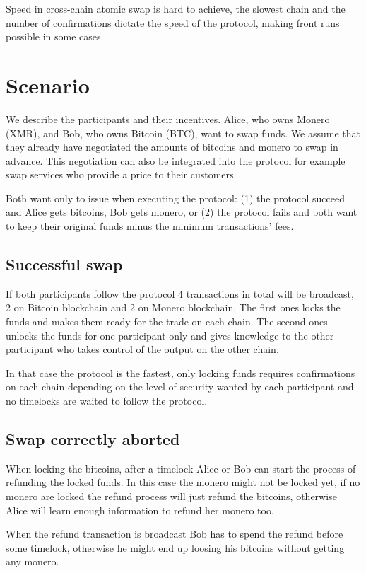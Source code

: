 \documentclass{llncs}
\begin{document}
Speed in cross-chain atomic swap is hard to achieve, the slowest chain and the number of confirmations dictate the speed of the protocol, making front runs possible in some cases.

\section{Scenario}
We describe the participants and their incentives. Alice, who owns Monero (XMR), and Bob, who owns Bitcoin (BTC), want to swap funds. We assume that they already have negotiated the amounts of bitcoins and monero to swap in advance. This negotiation can also be integrated into the protocol for example swap services who provide a price to their customers.

Both want only to issue when executing the protocol: (1) the protocol succeed and Alice gets bitcoins, Bob gets monero, or (2) the protocol fails and both want to keep their original funds minus the minimum transactions' fees.

\subsection{Successful swap}
If both participants follow the protocol 4 transactions in total will be broadcast, 2 on Bitcoin blockchain and 2 on Monero blockchain. The first ones locks the funds and makes them ready for the trade on each chain. The second ones unlocks the funds for one participant only and gives knowledge to the other participant who takes control of the output on the other chain.

In that case the protocol is the fastest, only locking funds requires confirmations on each chain depending on the level of security wanted by each participant and no timelocks are waited to follow the protocol.

\subsection{Swap correctly aborted}
When locking the bitcoins, after a timelock Alice or Bob can start the process of refunding the locked funds. In this case the monero might not be locked yet, if no monero are locked the refund process will just refund the bitcoins, otherwise Alice will learn enough information to refund her monero too.

When the refund transaction is broadcast Bob has to spend the refund before some timelock, otherwise he might end up loosing his bitcoins without getting any monero.
\end{document}
